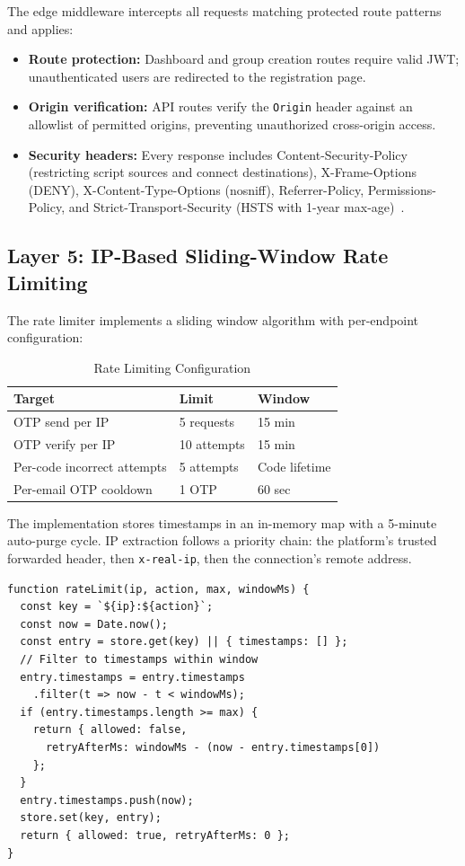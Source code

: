 \documentclass[11pt,a4paper]{article}
\theoremstyle{plain}
\theoremstyle{definition}
\theoremstyle{remark}
\begin{document}
The edge middleware intercepts all requests matching protected route patterns and applies:
\begin{itemize}[noitemsep,topsep=4pt]
    \item \textbf{Route protection:} Dashboard and group creation routes require valid JWT; unauthenticated users are redirected to the registration page.
    \item \textbf{Origin verification:} API routes verify the \texttt{Origin} header against an allowlist of permitted origins, preventing unauthorized cross-origin access.
    \item \textbf{Security headers:} Every response includes Content-Security-Policy (restricting script sources and connect destinations), X-Frame-Options (DENY), X-Content-Type-Options (nosniff), Referrer-Policy, Permissions-Policy, and Strict-Transport-Security (HSTS with 1-year max-age)~\cite{owasp2021}.
\end{itemize}

\subsection{Layer 5: IP-Based Sliding-Window Rate Limiting}

The rate limiter implements a sliding window algorithm with per-endpoint configuration:

\begin{table}[htbp]
\centering
\caption{Rate Limiting Configuration}
\label{tab:ratelimit}
\small
\renewcommand{\arraystretch}{1.15}
\begin{tabular}{@{}lll@{}}
\toprule
\textbf{Target} & \textbf{Limit} & \textbf{Window} \\
\midrule
OTP send per IP & 5 requests & 15 min \\
OTP verify per IP & 10 attempts & 15 min \\
Per-code incorrect attempts & 5 attempts & Code lifetime \\
Per-email OTP cooldown & 1 OTP & 60 sec \\
\bottomrule
\end{tabular}
\end{table}

The implementation stores timestamps in an in-memory map with a 5-minute auto-purge cycle. IP extraction follows a priority chain: the platform's trusted forwarded header, then \texttt{x-real-ip}, then the connection's remote address.

\begin{lstlisting}[language={}, caption={Sliding-window rate limiter}, label={lst:ratelimit}]
function rateLimit(ip, action, max, windowMs) {
  const key = `${ip}:${action}`;
  const now = Date.now();
  const entry = store.get(key) || { timestamps: [] };
  // Filter to timestamps within window
  entry.timestamps = entry.timestamps
    .filter(t => now - t < windowMs);
  if (entry.timestamps.length >= max) {
    return { allowed: false,
      retryAfterMs: windowMs - (now - entry.timestamps[0])
    };
  }
  entry.timestamps.push(now);
  store.set(key, entry);
  return { allowed: true, retryAfterMs: 0 };
}
\end{lstlisting}
\end{document}
